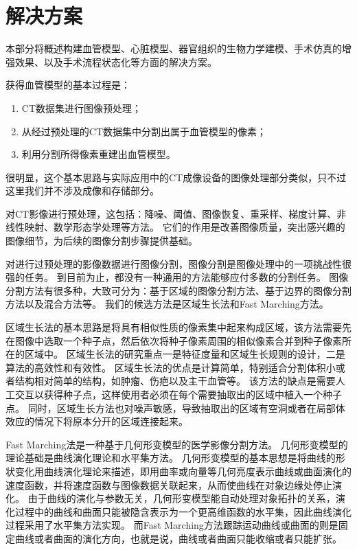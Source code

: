 \section{解决方案}
\label{sec1-2}

本部分将概述构建血管模型、心脏模型、器官组织的生物力学建模、手术仿真的增强效果、以及手术流程状态化等方面的解决方案。

获得血管模型的基本过程是\cite{Preim2008Review}：
\begin{enumerate}
  \item CT数据集进行图像预处理；
  \item 从经过预处理的CT数据集中分割出属于血管模型的像素；
  \item 利用分割所得像素重建出血管模型。
\end{enumerate}
很明显，这个基本思路与实际应用中的CT成像设备的图像处理部分类似，只不过这里我们并不涉及成像和存储部分。

对CT影像进行预处理，这包括：降噪、阈值、图像恢复、重采样、梯度计算、非线性映射、数学形态学处理等方法。
它们的作用是改善图像质量，突出感兴趣的图像细节，为后续的图像分割步骤提供基础。

对进行过预处理的影像数据进行图像分割，图像分割是图像处理中的一项挑战性很强的任务。
到目前为止，都没有一种通用的方法能够应付多数的分割任务。
图像分割方法有很多种，大致可分为：基于区域的图像分割方法、基于边界的图像分割方法以及混合方法等。
我们的候选方法是区域生长法和Fast Marching方法。

区域生长法的基本思路是将具有相似性质的像素集中起来构成区域，该方法需要先在图像中选取一个种子点，然后依次将种子像素周围的相似像素合并到种子像素所在的区域中。
区域生长法的研究重点一是特征度量和区域生长规则的设计，二是算法的高效性和有效性。
区域生长法的优点是计算简单，特别适合分割体积小或者结构相对简单的结构，如肿瘤、伤疤以及主干血管等。
该方法的缺点是需要人工交互以获得种子点，这样使用者必须在每个需要抽取出的区域中植入一个种子点。
同时，区域生长方法也对噪声敏感，导致抽取出的区域有空洞或者在局部体效应的情况下将原本分开的区域连接起来。

Fast Marching法是一种基于几何形变模型的医学影像分割方法。
几何形变模型的理论基础是曲线演化理论和水平集方法。
几何形变模型的基本思想是将曲线的形状变化用曲线演化理论来描述，即用曲率或向量等几何亮度表示曲线或曲面演化的速度函数，并将速度函数与图像数据关联起来，从而使曲线在对象边缘处停止演化。
由于曲线的演化与参数无关，几何形变模型能自动处理对象拓扑的关系，演化过程中的曲线和曲面只能被隐含表示为一个更高维函数的水平集，因此曲线演化过程采用了水平集方法实现。
而Fast Marching方法跟踪运动曲线或曲面的则是固定曲线或者曲面的演化方向，也就是说，曲线或者曲面只能收缩或者只能扩张。

